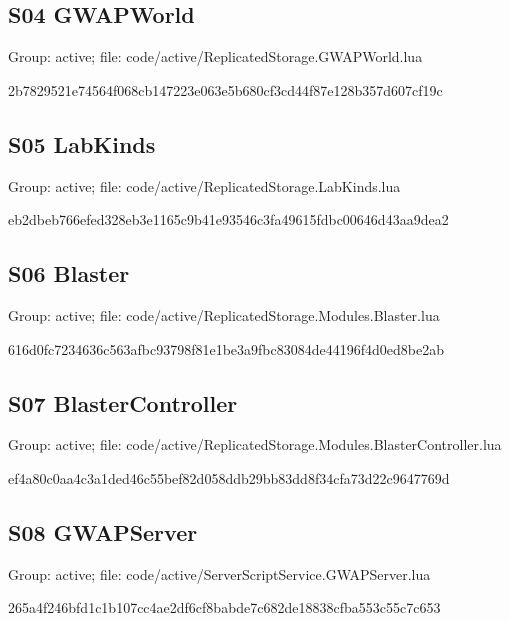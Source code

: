 \subsection{S04 GWAPWorld}
Group: active; file: code/\allowbreak{}active/\allowbreak{}ReplicatedStorage.\allowbreak{}GWAPWorld.\allowbreak{}lua

\begin{flushleft}\ttfamily\footnotesize 2b7829521e74564f068cb147223e063e5b680cf3cd44f87e128b357d607cf19c\end{flushleft}
\subsection{S05 LabKinds}
Group: active; file: code/\allowbreak{}active/\allowbreak{}ReplicatedStorage.\allowbreak{}LabKinds.\allowbreak{}lua

\begin{flushleft}\ttfamily\footnotesize eb2dbeb766efed328eb3e1165c9b41e93546c3fa49615fdbc00646d43aa9dea2\end{flushleft}
\subsection{S06 Blaster}
Group: active; file: code/\allowbreak{}active/\allowbreak{}ReplicatedStorage.\allowbreak{}Modules.\allowbreak{}Blaster.\allowbreak{}lua

\begin{flushleft}\ttfamily\footnotesize 616d0fc7234636c563afbc93798f81e1be3a9fbc83084de44196f4d0ed8be2ab\end{flushleft}
\subsection{S07 BlasterController}
Group: active; file: code/\allowbreak{}active/\allowbreak{}ReplicatedStorage.\allowbreak{}Modules.\allowbreak{}BlasterController.\allowbreak{}lua

\begin{flushleft}\ttfamily\footnotesize ef4a80c0aa4c3a1ded46c55bef82d058ddb29bb83dd8f34cfa73d22c9647769d\end{flushleft}
\subsection{S08 GWAPServer}
Group: active; file: code/\allowbreak{}active/\allowbreak{}ServerScriptService.\allowbreak{}GWAPServer.\allowbreak{}lua

\begin{flushleft}\ttfamily\footnotesize 265a4f246bfd1c1b107cc4ae2df6cf8babde7c682de18838cfba553c55c7c653\end{flushleft}
